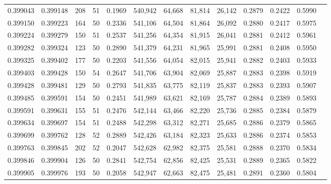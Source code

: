 \begin{tabular}{rrrrrrrrrrrrr}
0.399043 & 0.399148 &   208 &  51 &                                     0.1969 & 540,942 &  64,668 &  81,814 &  26,142 & 0.2879 & 0.2422 & 0.5990 \\
0.399150 & 0.399223 &   164 &  50 &                                     0.2336 & 541,106 &  64,504 &  81,864 &  26,092 & 0.2880 & 0.2417 & 0.5975 \\
0.399224 & 0.399279 &   150 &  51 &                                     0.2537 & 541,256 &  64,354 &  81,915 &  26,041 & 0.2881 & 0.2412 & 0.5961 \\
0.399282 & 0.399324 &   123 &  50 &                                     0.2890 & 541,379 &  64,231 &  81,965 &  25,991 & 0.2881 & 0.2408 & 0.5950 \\
0.399325 & 0.399402 &   177 &  50 &                                     0.2203 & 541,556 &  64,054 &  82,015 &  25,941 & 0.2882 & 0.2403 & 0.5933 \\
0.399403 & 0.399428 &   150 &  54 &                                     0.2647 & 541,706 &  63,904 &  82,069 &  25,887 & 0.2883 & 0.2398 & 0.5919 \\
0.399428 & 0.399481 &   129 &  50 &                                     0.2793 & 541,835 &  63,775 &  82,119 &  25,837 & 0.2883 & 0.2393 & 0.5907 \\
0.399485 & 0.399591 &   154 &  50 &                                     0.2451 & 541,989 &  63,621 &  82,169 &  25,787 & 0.2884 & 0.2389 & 0.5893 \\
0.399591 & 0.399631 &   155 &  51 &                                     0.2476 & 542,144 &  63,466 &  82,220 &  25,736 & 0.2885 & 0.2384 & 0.5879 \\
0.399634 & 0.399697 &   154 &  51 &                                     0.2488 & 542,298 &  63,312 &  82,271 &  25,685 & 0.2886 & 0.2379 & 0.5865 \\
0.399699 & 0.399762 &   128 &  52 &                                     0.2889 & 542,426 &  63,184 &  82,323 &  25,633 & 0.2886 & 0.2374 & 0.5853 \\
0.399763 & 0.399845 &   202 &  52 &                                     0.2047 & 542,628 &  62,982 &  82,375 &  25,581 & 0.2888 & 0.2370 & 0.5834 \\
0.399846 & 0.399904 &   126 &  50 &                                     0.2841 & 542,754 &  62,856 &  82,425 &  25,531 & 0.2889 & 0.2365 & 0.5822 \\
0.399905 & 0.399976 &   193 &  50 &                                     0.2058 & 542,947 &  62,663 &  82,475 &  25,481 & 0.2891 & 0.2360 & 0.5804 \\

\end{tabular}
